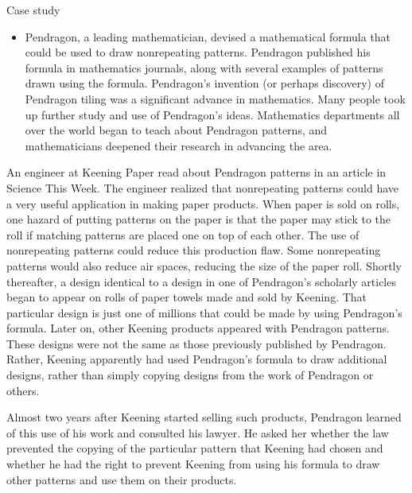 \documentclass[ignorenonframetext,aspectratio=169]{beamer}
\providecommand{\tightlist}{%
  \setlength{\itemsep}{0pt}\setlength{\parskip}{0pt}}
\begin{document}
\begin{frame}{Case study}
\protect\hypertarget{case-study}{}

\begin{itemize}
\tightlist
\item
  Pendragon, a leading mathematician, devised a mathematical formula
  that could be used to draw nonrepeating patterns. Pendragon published
  his formula in mathematics journals, along with several examples of
  patterns drawn using the formula. Pendragon's invention (or perhaps
  discovery) of Pendragon tiling was a significant advance in
  mathematics. Many people took up further study and use of Pendragon's
  ideas. Mathematics departments all over the world began to teach about
  Pendragon patterns, and mathematicians deepened their research in
  advancing the area.
\end{itemize}

\end{frame}

\begin{frame}{}
\protect\hypertarget{section-6}{}

An engineer at Keening Paper read about Pendragon patterns in an article
in Science This Week. The engineer realized that nonrepeating patterns
could have a very useful application in making paper products. When
paper is sold on rolls, one hazard of putting patterns on the paper is
that the paper may stick to the roll if matching patterns are placed one
on top of each other. The use of nonrepeating patterns could reduce this
production flaw. Some nonrepeating patterns would also reduce air
spaces, reducing the size of the paper roll. Shortly thereafter, a
design identical to a design in one of Pendragon's scholarly articles
began to appear on rolls of paper towels made and sold by Keening. That
particular design is just one of millions that could be made by using
Pendragon's formula. Later on, other Keening products appeared with
Pendragon patterns. These designs were not the same as those previously
published by Pendragon. Rather, Keening apparently had used Pendragon's
formula to draw additional designs, rather than simply copying designs
from the work of Pendragon or others.

\end{frame}

\begin{frame}{}
\protect\hypertarget{section-7}{}

Almost two years after Keening started selling such products, Pendragon
learned of this use of his work and consulted his lawyer. He asked her
whether the law prevented the copying of the particular pattern that
Keening had chosen and whether he had the right to prevent Keening from
using his formula to draw other patterns and use them on their products.

\end{frame}
\end{document}
